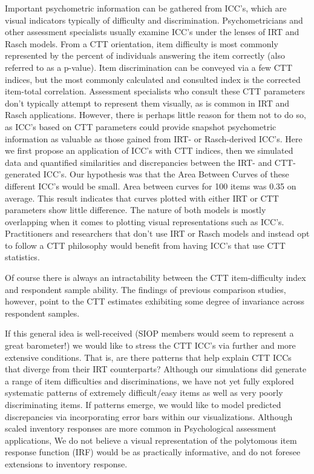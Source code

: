 \documentclass[
  man]{apa6}
\begin{document}
Important psychometric information can be gathered from ICC's, which are visual indicators typically of difficulty and discrimination. Psychometricians and other assessment specialists usually examine ICC's under the lenses of IRT and Rasch models. From a CTT orientation, item difficulty is most commonly represented by the percent of individuals answering the item correctly (also referred to as a p-value). Item discrimination can be conveyed via a few CTT indices, but the most commonly calculated and consulted index is the corrected item-total correlation. Assessment specialists who consult these CTT parameters don't typically attempt to represent them visually, as is common in IRT and Rasch applications. However, there is perhaps little reason for them not to do so, as ICC's based on CTT parameters could provide snapshot psychometric information as valuable as those gained from IRT- or Rasch-derived ICC's. Here we first propose an application of ICC's with CTT indices, then we simulated data and quantified similarities and discrepancies between the IRT- and CTT-generated ICC's. Our hypothesis was that the Area Between Curves of these different ICC's would be small. Area between curves for 100 items was 0.35 on average. This result indicates that curves plotted with either IRT or CTT parameters show little difference. The nature of both models is mostly overlapping when it comes to plotting visual representations such as ICC's. Practitioners and researchers that don't use IRT or Rasch models and instead opt to follow a CTT philosophy would benefit from having ICC's that use CTT statistics.

Of course there is always an intractability between the CTT item-difficulty index and respondent sample ability. The findings of previous comparison studies, however, point to the CTT estimates exhibiting some degree of invariance across respondent samples.

If this general idea is well-received (SIOP members would seem to represent a great barometer!) we would like to stress the CTT ICC's via further and more extensive conditions. That is, are there patterns that help explain CTT ICCs that diverge from their IRT counterparts? Although our simulations did generate a range of item difficulties and discriminations, we have not yet fully explored systematic patterns of extremely difficult/easy items as well as very poorly discriminating items. If patterns emerge, we would like to model predicted discrepancies via incorporating error bars within our visualizations. Although scaled inventory responses are more common in Psychological assessment applications, We do not believe a visual representation of the polytomous item response function (IRF) would be as practically informative, and do not foresee extensions to inventory response.
\end{document}
